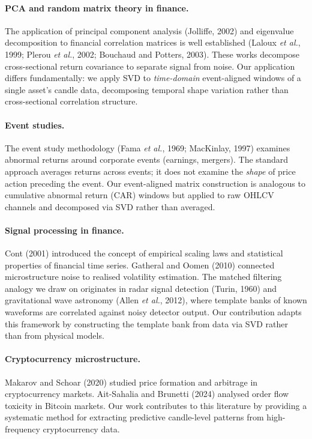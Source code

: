\documentclass[11pt,a4paper]{article}
\theoremstyle{definition}
\theoremstyle{plain}
\begin{document}
\paragraph{PCA and random matrix theory in finance.}
The application of principal component analysis (Jolliffe, 2002) and
eigenvalue decomposition to financial correlation matrices is well
established (Laloux \emph{et al.}, 1999; Plerou \emph{et
al.}, 2002; Bouchaud and Potters, 2003). These works decompose
cross-sectional return covariance to separate signal from noise. Our
application differs fundamentally: we apply SVD to \emph{time-domain}
event-aligned windows of a single asset's candle data, decomposing temporal
shape variation rather than cross-sectional correlation structure.

\paragraph{Event studies.}
The event study methodology (Fama \emph{et al.}, 1969; MacKinlay, 1997)
examines abnormal returns around corporate events (earnings, mergers). The
standard approach averages returns across events; it does not examine the
\emph{shape} of price action preceding the event. Our event-aligned matrix
construction is analogous to cumulative abnormal return (CAR) windows but
applied to raw OHLCV channels and decomposed via SVD rather than averaged.

\paragraph{Signal processing in finance.}
Cont (2001) introduced the concept of empirical scaling laws and statistical
properties of financial time series. Gatheral and Oomen (2010) connected
microstructure noise to realised volatility estimation. The matched
filtering analogy we draw on originates in radar signal detection (Turin,
1960) and gravitational wave astronomy (Allen \emph{et al.}, 2012), where
template banks of known waveforms are correlated against noisy detector
output. Our contribution adapts this framework by constructing the template
bank from data via SVD rather than from physical models.

\paragraph{Cryptocurrency microstructure.}
Makarov and Schoar (2020) studied price formation and arbitrage in
cryptocurrency markets. Ait-Sahalia and Brunetti (2024) analysed order flow
toxicity in Bitcoin markets. Our work contributes to this literature by
providing a systematic method for extracting predictive candle-level
patterns from high-frequency cryptocurrency data.
\end{document}

